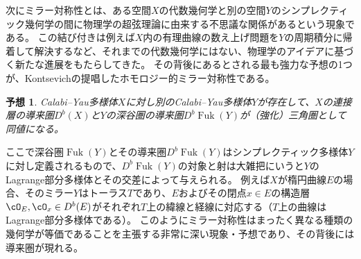 \documentclass[uplatex,a4paper,dvipdfmx]{jsarticle}
\theoremstyle{plain}
\newtheorem{conjecture}[theorem]{予想}
\theoremstyle{definition}
\DeclareMathOperator{\Fuk}{Fuk}
\begin{document}
次にミラー対称性とは、ある空間$X$の代数幾何学と別の空間$Y$のシンプレクティック幾何学の間に物理学の超弦理論に由来する不思議な関係があるという現象である。
この結び付きは例えば$X$内の有理曲線の数え上げ問題を$Y$の周期積分に帰着して解決するなど、それまでの代数幾何学にはない、物理学のアイデアに基づく新たな進展をもたらしてきた。
その背後にあるとされる最も強力な予想の1つが、Kontsevichの提唱したホモロジー的ミラー対称性である。
\begin{conjecture}
	Calabi--Yau多様体$X$に対し別のCalabi--Yau多様体$Y$が存在して、$X$の連接層の導来圏$D^b (X)$と$Y$の深谷圏の導来圏$D^b \Fuk(Y)$が（強化）三角圏として同値になる。
\end{conjecture}
ここで深谷圏$\Fuk(Y)$とその導来圏$D^b \Fuk(Y)$はシンプレクティック多様体$Y$に対し定義されるもので、$D^b \Fuk(Y)$の対象と射は大雑把にいうと$Y$のLagrange部分多様体とその交差によって与えられる。
例えば$X$が楕円曲線$E$の場合、そのミラー$Y$はトーラス$T$であり、$E$およびその閉点$x \in E$の構造層$\cO_E, \cO_x \in D^b(E)$がそれぞれ$T$上の緯線と経線に対応する（$T$上の曲線はLagrange部分多様体である）。
このようにミラー対称性はまったく異なる種類の幾何学が等価であることを主張する非常に深い現象・予想であり、その背後には導来圏が現れる。
\end{document}
